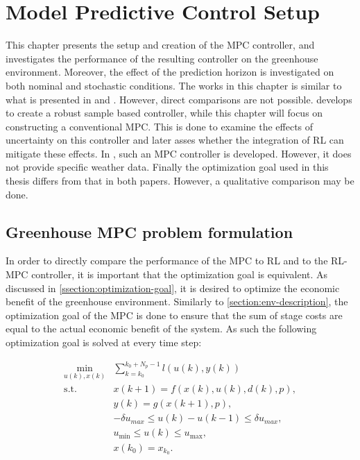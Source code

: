 \chapter{Model Predictive Control Setup}
\label{chapter:MPC}
This chapter presents the setup and creation of the MPC controller, and investigates the performance of the resulting controller on the greenhouse environment. Moreover, the effect of the prediction horizon is investigated on both nominal and stochastic conditions. The works in this chapter is similar to what is presented in \cite{boersmaRobustSamplebasedModel2022} and \cite{morcegoReinforcementLearningModel2023}. However, direct comparisons are not possible. \cite{boersmaRobustSamplebasedModel2022} develops to create a robust sample based controller, while this chapter will focus on constructing a conventional MPC. This is done to examine the effects of uncertainty on this controller and later asses whether the integration of RL can mitigate these effects. In \cite{morcegoReinforcementLearningModel2023}, such an MPC controller is developed. However, it does not provide specific weather data. Finally the optimization goal used in this thesis differs from that in both papers. However, a qualitative comparison may be done.




\section{Greenhouse MPC problem formulation}\label{section: greenhouse MPC formulation}
In order to directly compare the performance of the MPC to RL and to the RL-MPC controller, it is important that the optimization goal is equivalent. As discussed in \autoref{ssection:optimization-goal}, it is desired to optimize the economic benefit of the greenhouse environment. Similarly to \autoref{section:env-description}, the optimization goal of the MPC is done to ensure that the sum of stage costs are equal to the actual economic benefit of the system. As such the following optimization goal is solved at every time step:

\begin{subequations} \label{eq:mpc_ocp}
	\begin{align}
		\min_{u(k),x(k)} & \sum_{k = k_0}^{k_0 + N_p-1} {l(u(k), y(k))} \\
		\text{s.t.} \quad & x(k+1) = f(x(k), u(k), d(k), p),  \label{eq:constraint-1} \\
		& y(k) = g(x(k+1), p), \label{eq:constraint-dynamics} \\
		& -\delta u_{max} \leq u(k) - u(k-1) \leq \delta u_{max}, \label{eq:constraint-delta-u} \\
		& u_{\min} \leq u(k) \leq u_{\max}, \label{eq:constraint-u-limits}\\
		& x(k_0) = x_{k_0}. \label{eq:constraint-initial}
	\end{align}
\end{subequations}

